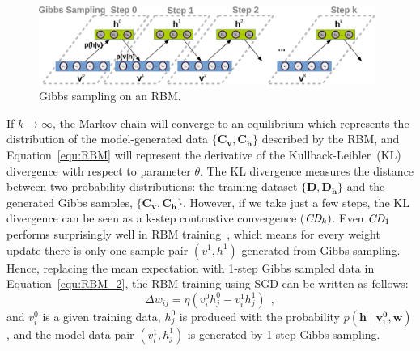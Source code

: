 \begin{figure}[hbt]
	\centering
	\includegraphics[width=0.98\textwidth]{pics_sdlm/gibbs_sampling.pdf}
	\caption{Gibbs sampling on an RBM.}
	\label{fig:gibbs}
\end{figure}

If $ k \to \infty $, the Markov chain will converge to an equilibrium which represents the distribution of the model-generated data $\{\mathbf{C_v}, \mathbf{C_h}\}$ described by the RBM, and Equation~\ref{equ:RBM} will represent the derivative of the Kullback-Leibler~(KL) divergence with respect to parameter $\theta$.
The KL divergence measures the distance between two probability distributions: the training dataset $\{\mathbf{D}, \mathbf{D_h}\}$ and the generated Gibbs samples, $\{\mathbf{C_v}, \mathbf{C_h}\}$.
However, if we take just a few steps, the KL divergence can be seen as a k-step contrastive convergence ($ \textit{\textrm{CD}}_{k}) $.
Even $ \textit{\textrm{CD}}_1 $ performs surprisingly well in RBM training~\citep{hinton2002training}, which means for every weight update there is only one sample pair $(v^1, h^1)$ generated from Gibbs sampling.
Hence, replacing the mean expectation with 1-step Gibbs sampled data in Equation~\ref{equ:RBM_2}, the RBM training using SGD can be written as follows:
\begin{equation}
\Delta w_{ij} = \eta (v^0_i h^0_j-v^1_i h^1_j)~~,
\label{equ:rbm_train}
\end{equation}
and $v^0_i$ is a given training data, $h^0_j$ is produced with the probability $p( \mathbf{h} \mid \mathbf{v^0_i}, \mathbf{w})$, and the model data pair $(v^1_i, h^1_j)$ is generated by 1-step Gibbs sampling.


